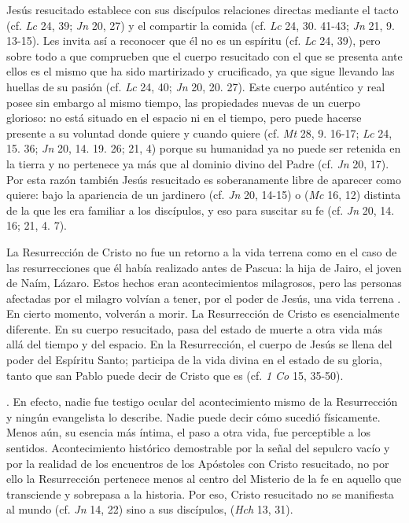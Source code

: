 \begin{ccebody}
 Jesús resucitado establece con sus discípulos relaciones directas mediante el tacto (cf. \textit{Lc} 24, 39; \textit{Jn} 20, 27) y el compartir la comida (cf. \textit{Lc} 24, 30. 41-43; \textit{Jn} 21, 9. 13-15). Les invita así a reconocer que él no es un espíritu (cf. \textit{Lc} 24, 39), pero sobre todo a que comprueben que el cuerpo resucitado con el que se presenta ante ellos es el mismo que ha sido martirizado y crucificado, ya que sigue llevando las huellas de su pasión (cf. \textit{Lc} 24, 40; \textit{Jn} 20, 20. 27). Este cuerpo auténtico y real posee sin embargo al mismo tiempo, las propiedades nuevas de un cuerpo glorioso: no está situado en el espacio ni en el tiempo, pero puede hacerse presente a su voluntad donde quiere y cuando quiere (cf. \textit{Mt} 28, 9. 16-17; \textit{Lc} 24, 15. 36; \textit{Jn} 20, 14. 19. 26; 21, 4) porque su humanidad ya no puede ser retenida en la tierra y no pertenece ya más que al dominio divino del Padre (cf. \textit{Jn} 20, 17). Por esta razón también Jesús resucitado es soberanamente libre de aparecer como quiere: bajo la apariencia de un jardinero (cf. \textit{Jn} 20, 14-15) o  (\textit{Mc} 16, 12) distinta de la que les era familiar a los discípulos, y eso para suscitar su fe (cf. \textit{Jn} 20, 14. 16; 21, 4. 7).

 La Resurrección de Cristo no fue un retorno a la vida terrena como en el caso de las resurrecciones que él había realizado antes de Pascua: la hija de Jairo, el joven de Naím, Lázaro. Estos hechos eran acontecimientos milagrosos, pero las personas afectadas por el milagro volvían a tener, por el poder de Jesús, una vida terrena . En cierto momento, volverán a morir. La Resurrección de Cristo es esencialmente diferente. En su cuerpo resucitado, pasa del estado de muerte a otra vida más allá del tiempo y del espacio. En la Resurrección, el cuerpo de Jesús se llena del poder del Espíritu Santo; participa de la vida divina en el estado de su gloria, tanto que san Pablo puede decir de Cristo que es  (cf. \textit{1 Co} 15, 35-50).


 . En efecto, nadie fue testigo ocular del acontecimiento mismo de la Resurrección y ningún evangelista lo describe. Nadie puede decir cómo sucedió físicamente. Menos aún, su esencia más íntima, el paso a otra vida, fue perceptible a los sentidos. Acontecimiento histórico demostrable por la señal del sepulcro vacío y por la realidad de los encuentros de los Apóstoles con Cristo resucitado, no por ello la Resurrección pertenece menos al centro del Misterio de la fe en aquello que transciende y sobrepasa a la historia. Por eso, Cristo resucitado no se manifiesta al mundo (cf. \textit{Jn} 14, 22) sino a sus discípulos,  (\textit{Hch} 13, 31).


\end{ccebody}
